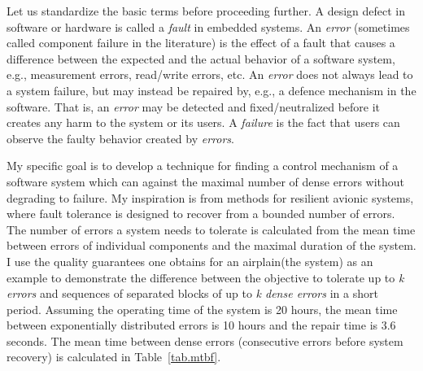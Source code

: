Let us standardize the basic terms before proceeding further.
A design defect in software or hardware is called a {\it fault} in embedded systems.
An {\it error} (sometimes called component failure in the literature) is the effect of a fault that causes a difference between the expected and the actual behavior of a software system, e.g., measurement errors, read/write errors, etc. 
An {\it error} does not always lead to a system failure, but may instead be repaired by, e.g., a defence mechanism in the software. 
That is, an {\it error} may be detected and fixed/neutralized before it creates any harm to the system or its users.
A {\it failure} is the fact that users can observe the faulty behavior created by {\it errors}.

My specific goal is to develop a technique for finding a control mechanism of a software system which can against the maximal number of dense errors without degrading to failure.
My inspiration is from methods for resilient avionic systems\cite{conf/ftrtft/1992}, where fault tolerance is designed to recover from a bounded number of errors.
The number of errors a system needs to tolerate is calculated from the mean time between errors of individual components and the maximal duration of the system.
I use the quality guarantees one obtains for an airplain(the system) as an example to demonstrate the difference between the objective to tolerate up to {\it k errors} and sequences of separated blocks of up to {\it k dense errors} in a short period.
Assuming the operating time of the system is 20 hours, the mean time between exponentially distributed errors is 10 hours and the repair time is 3.6 seconds.
The mean time between dense errors (consecutive errors before system recovery) is calculated in Table~\ref{tab.mtbf}.
\begin{table*}
\begin{center}
\end{center}
\caption{Probabilities of $k$ dense errors} 
\label{tab.mtbf} 
\end{table*} 
